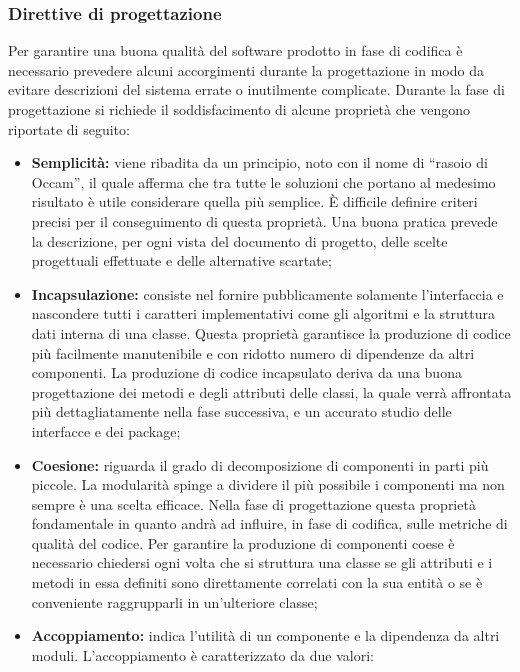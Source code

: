     \subsubsection{Direttive di progettazione}
     Per garantire una buona qualità del software prodotto in fase di codifica è necessario prevedere alcuni accorgimenti durante la progettazione in modo da evitare descrizioni del sistema errate o inutilmente complicate. Durante la fase di progettazione si richiede il soddisfacimento di alcune proprietà che vengono riportate di seguito:
     \begin{itemize}
     
     
     \item \textbf{Semplicità:} viene ribadita da un principio, noto con il nome di “rasoio di Occam”, il quale afferma che tra tutte le soluzioni che portano al medesimo risultato è utile considerare quella più semplice. È difficile definire criteri precisi per il conseguimento di questa proprietà. Una buona pratica prevede la  descrizione, per ogni vista del documento di progetto, delle scelte progettuali
     effettuate e delle alternative scartate;
     \item \textbf{Incapsulazione:} consiste nel fornire pubblicamente solamente l’interfaccia e  nascondere tutti i caratteri implementativi come gli algoritmi e la struttura  dati interna di una classe. Questa proprietà garantisce la produzione di codice più facilmente manutenibile e con ridotto numero di dipendenze da altri componenti. La produzione di codice incapsulato deriva da una buona progettazione dei metodi e degli attributi delle classi, la quale verrà affrontata più dettagliatamente nella fase successiva, e un accurato studio delle interfacce e dei package;
     \item \textbf{Coesione:} riguarda il grado di decomposizione di componenti in parti più piccole. La modularità spinge a dividere il più possibile i componenti ma non sempre è una scelta efficace. Nella fase di progettazione questa proprietà fondamentale in quanto andrà ad influire, in fase di codifica, sulle metriche di  qualità del codice. Per garantire la produzione di componenti coese è necessario chiedersi ogni volta che si struttura una classe se gli attributi e i metodi in essa definiti sono direttamente correlati con la sua entità o se è conveniente raggrupparli in un’ulteriore classe;
     \item \textbf{Accoppiamento:} indica l’utilità di un componente e la dipendenza da altri moduli. L’accoppiamento è caratterizzato da due valori:
     \begin{itemize}


\end{itemize}
\end{itemize}
